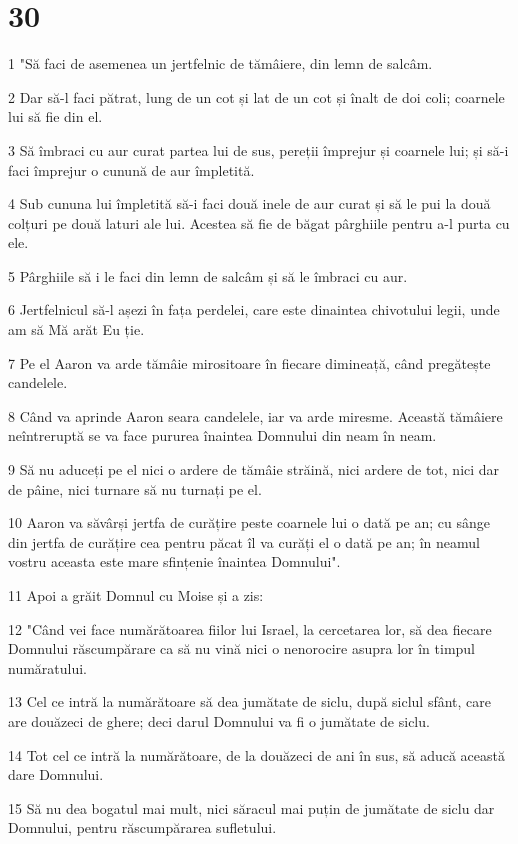 \chapter{30}

\par 1 "Să faci de asemenea un jertfelnic de tămâiere, din lemn de salcâm.
\par 2 Dar să-l faci pătrat, lung de un cot și lat de un cot și înalt de doi coli; coarnele lui să fie din el.
\par 3 Să îmbraci cu aur curat partea lui de sus, pereții împrejur și coarnele lui; și să-i faci împrejur o cunună de aur împletită.
\par 4 Sub cununa lui împletită să-i faci două inele de aur curat și să le pui la două colțuri pe două laturi ale lui. Acestea să fie de băgat pârghiile pentru a-l purta cu ele.
\par 5 Pârghiile să i le faci din lemn de salcâm și să le îmbraci cu aur.
\par 6 Jertfelnicul să-l așezi în fața perdelei, care este dinaintea chivotului legii, unde am să Mă arăt Eu ție.
\par 7 Pe el Aaron va arde tămâie mirositoare în fiecare dimineață, când pregătește candelele.
\par 8 Când va aprinde Aaron seara candelele, iar va arde miresme. Această tămâiere neîntreruptă se va face pururea înaintea Domnului din neam în neam.
\par 9 Să nu aduceți pe el nici o ardere de tămâie străină, nici ardere de tot, nici dar de pâine, nici turnare să nu turnați pe el.
\par 10 Aaron va săvârși jertfa de curățire peste coarnele lui o dată pe an; cu sânge din jertfa de curățire cea pentru păcat îl va curăți el o dată pe an; în neamul vostru aceasta este mare sfințenie înaintea Domnului".
\par 11 Apoi a grăit Domnul cu Moise și a zis:
\par 12 "Când vei face numărătoarea fiilor lui Israel, la cercetarea lor, să dea fiecare Domnului răscumpărare ca să nu vină nici o nenorocire asupra lor în timpul număratului.
\par 13 Cel ce intră la numărătoare să dea jumătate de siclu, după siclul sfânt, care are douăzeci de ghere; deci darul Domnului va fi o jumătate de siclu.
\par 14 Tot cel ce intră la numărătoare, de la douăzeci de ani în sus, să aducă această dare Domnului.
\par 15 Să nu dea bogatul mai mult, nici săracul mai puțin de jumătate de siclu dar Domnului, pentru răscumpărarea sufletului.
